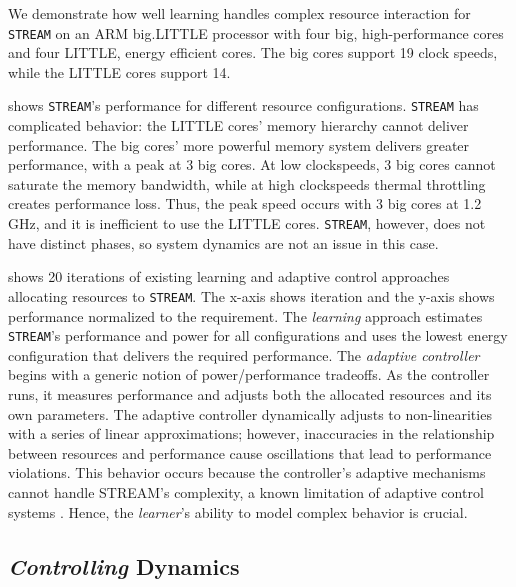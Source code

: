 We demonstrate how well learning handles complex resource interaction
for \texttt{STREAM} on an ARM big.LITTLE processor with four big,
high-performance cores and four LITTLE, energy efficient cores.  The
big cores support 19 clock speeds, while the LITTLE cores support 14.


 shows \texttt{STREAM}'s performance for
different resource configurations.  \texttt{STREAM} has complicated
behavior: the LITTLE cores' memory hierarchy cannot deliver
performance.  The big cores' more powerful memory system delivers
greater performance, with a peak at 3 big cores.  At low clockspeeds,
3 big cores cannot saturate the memory bandwidth, while at high
clockspeeds thermal throttling creates performance loss.  Thus, the
peak speed occurs with 3 big cores at 1.2 GHz, and it is inefficient
to use the LITTLE cores.  \texttt{STREAM}, however, does not have
distinct phases, so system dynamics are not an issue in this case.


 shows 20 iterations of existing learning
\cite{LEO} and adaptive control \cite{POET} approaches allocating
resources to \texttt{STREAM}.  The x-axis shows iteration and the
y-axis shows performance normalized to the requirement.  The
\emph{learning} approach estimates \texttt{STREAM}'s performance and
power for all configurations and uses the lowest energy configuration
that delivers the required performance.  The \emph{adaptive
  controller} begins with a generic notion of power/performance
tradeoffs.  As the controller runs, it measures performance and
adjusts both the allocated resources and its own parameters.  The
adaptive controller dynamically adjusts to non-linearities with a
series of linear approximations; however, inaccuracies in the
relationship between resources and performance cause oscillations that
lead to performance violations.  This behavior occurs because the
controller's adaptive mechanisms cannot handle STREAM's complexity, a
known limitation of adaptive control systems
\cite{ControlWare,POET,ICSE2014}.  Hence, the \emph{learner}'s ability
to model complex behavior is crucial.

\subsection{\emph{Controlling} Dynamics}
\label{sec:mov-control}

